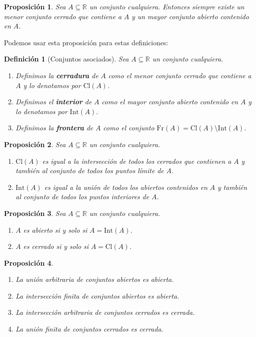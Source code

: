\documentclass{article}
\newtheorem{prop}{Proposición}
\newtheorem{define}{Definición}
\newcommand{\reales}{\mathbb{R}}
\newcommand{\cerradura}[1]{\text{Cl}(#1)}
\newcommand{\interior}[1]{\text{Int}(#1)}
\newcommand{\frontera}[1]{\text{Fr}(#1)}
\begin{document}
\begin{prop}
	Sea $A \subseteq \reales$ un conjunto cualquiera. Entonces siempre existe un menor conjunto cerrado que contiene a $A$ y un mayor conjunto abierto contenido en $A$.
\end{prop}

Podemos usar esta proposición para estas definiciones:

\begin{define}[Conjuntos asociados]
	Sea $A \subseteq \reales$ un conjunto cualquiera.
	\begin{enumerate}
		\item
		Definimos la \textbf{cerradura} de $A$ como el menor conjunto cerrado que contiene a $A$ y lo denotamos por $\cerradura{A}$.
		\item
		Definimos el \textbf{interior} de $A$ como el mayor conjunto abierto contenido en $A$ y lo denotamos por $\interior{A}$.
		\item
		Definimos la \textbf{frontera} de $A$ como el conjunto $\frontera{A} = \cerradura{A} \setminus \interior{A}$.
	\end{enumerate}
\end{define}

\begin{prop}
	Sea $A \subseteq \reales$ un conjunto cualquiera.
	\begin{enumerate}
		\item
		$\cerradura{A}$ es igual a la intersección de todos los cerrados que contienen a $A$ y también al conjunto de todos los puntos límite de $A$.
		\item
		$\interior{A}$ es igual a la unión de todos los abiertos contenidos en $A$ y también al conjunto de todos los puntos interiores de $A$.
	\end{enumerate}
\end{prop}

\begin{prop}
	Sea $A \subseteq \reales$ un conjunto cualquiera.
	\begin{enumerate}
		\item
		$A$ es abierto si y solo si $A = \interior{A}$.
		\item
		$A$ es cerrado si y solo si $A = \cerradura{A}$.
	\end{enumerate}
\end{prop}

\begin{prop}
	\begin{enumerate}
		\item
		La unión arbitraria de conjuntos abiertos es abierta.
		\item
		La intersección finita de conjuntos abiertos es abierta.
		\item
		La intersección arbitraria de conjuntos cerrados es cerrada.
		\item
		La unión finita de conjuntos cerrados es cerrada.
	\end{enumerate}
\end{prop}
\end{document}
